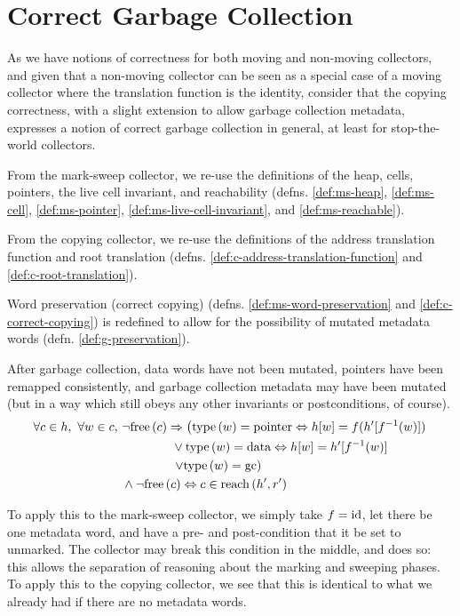 \section{Correct Garbage Collection}
\label{sec:gc-correct}

As we have notions of correctness for both moving and non-moving
collectors, and given that a non-moving collector can be seen as a
special case of a moving collector where the translation function is
the identity, consider that the copying correctness, with a slight
extension to allow garbage collection metadata, expresses a notion of
correct garbage collection in general, at least for stop-the-world
collectors.

From the mark-sweep collector, we re-use the definitions of the heap,
cells, pointers, the live cell invariant, and reachability
(defns. \ref{def:ms-heap}, \ref{def:ms-cell}, \ref{def:ms-pointer},
\ref{def:ms-live-cell-invariant}, and \ref{def:ms-reachable}).

From the copying collector, we re-use the definitions of the address
translation function and root translation
(defns. \ref{def:c-address-translation-function} and
\ref{def:c-root-translation}).

Word preservation (correct copying)
(defns. \ref{def:ms-word-preservation} and
\ref{def:c-correct-copying}) is redefined to allow for the possibility
of mutated metadata words (defn. \ref{def:g-preservation}).

\begin{definition}[Preservation]
  \label{def:g-preservation}
  After garbage collection, data words have not been mutated, pointers
  have been remapped consistently, and garbage collection metadata may
  have been mutated (but in a way which still obeys any other
  invariants or postconditions, of course).
  \begin{align*}
    \forall c \in h,\ \forall w \in c,\ &\lnot\mathrm{free}\left(c\right) \Rightarrow
    \left(\mathrm{type}\left(w\right) = \mathrm{pointer} \Leftrightarrow h[w] = f(h'[f^{-1}(w)])\right.\\
    &\quad\quad\quad\quad \lor \mathrm{type}\left(w\right) = \mathrm{data}
    \Leftrightarrow h[w] = h'[f^{-1}(w)]\\
    &\quad\quad\quad\quad \left.\lor \mathrm{type}\left(w\right) = \mathrm{gc}\right)\\
    &\land \lnot\mathrm{free}\left(c\right) \Leftrightarrow c \in \mathrm{reach}\left(h', r'\right)
  \end{align*}
\end{definition}

To apply this to the mark-sweep collector, we simply take $f = \mathrm{id}$,
let there be one metadata word, and have a pre- and post-condition
that it be set to unmarked. The collector may break this condition in
the middle, and does so: this allows the separation of reasoning about
the marking and sweeping phases. To apply this to the copying
collector, we see that this is identical to what we already had if
there are no metadata words.

